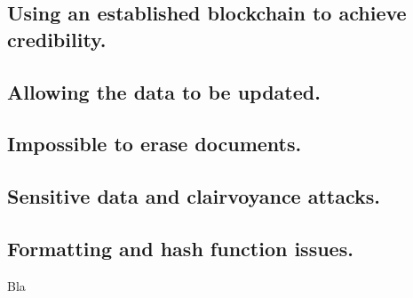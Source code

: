 \subsection{Using an established blockchain to achieve credibility.}



\subsection{Allowing the data to be updated.}



\subsection{Impossible to erase documents.}



\subsection{Sensitive data and clairvoyance attacks.}



\subsection{Formatting and hash function issues.}


Bla